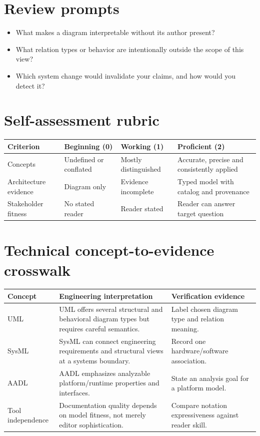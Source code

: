 \documentclass[10pt,letterpaper]{article}
\begin{document}
\section{Review prompts}
\begin{itemize}
\item What makes a diagram interpretable without its author present?
\item What relation types or behavior are intentionally outside the scope of this view?
\item Which system change would invalidate your claims, and how would you detect it?
\end{itemize}
\section{Self-assessment rubric}
\small
\begin{tabularx}{\linewidth}{@{}YYYY@{}}
\toprule
\textbf{Criterion} & \textbf{Beginning (0)} & \textbf{Working (1)} & \textbf{Proficient (2)} \\
\midrule
Concepts & Undefined or conflated & Mostly distinguished & Accurate, precise and consistently applied \\
Architecture evidence & Diagram only & Evidence incomplete & Typed model with catalog and provenance \\
Stakeholder fitness & No stated reader & Reader stated & Reader can answer target question \\
\bottomrule
\end{tabularx}
\normalsize
\section{Technical concept-to-evidence crosswalk}
\small
\begin{tabularx}{\linewidth}{@{}YYY@{}}
\toprule
\textbf{Concept} & \textbf{Engineering interpretation} & \textbf{Verification evidence} \\
\midrule
UML & UML offers several structural and behavioral diagram types but requires careful semantics. & Label chosen diagram type and relation meaning. \\
SysML & SysML can connect engineering requirements and structural views at a systems boundary. & Record one hardware/software association. \\
AADL & AADL emphasizes analyzable platform/runtime properties and interfaces. & State an analysis goal for a platform model. \\
Tool independence & Documentation quality depends on model fitness, not merely editor sophistication. & Compare notation expressiveness against reader skill. \\
\bottomrule
\end{tabularx}
\normalsize
\end{document}
